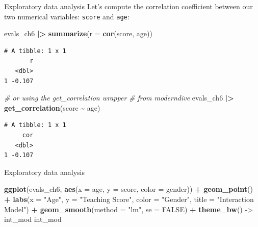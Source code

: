 \documentclass[
  ignorenonframetext,
]{beamer}
\newenvironment{Shaded}{\begin{snugshade}}{\end{snugshade}}
\newcommand{\AttributeTok}[1]{\textcolor[rgb]{0.13,0.29,0.53}{#1}}
\newcommand{\CommentTok}[1]{\textcolor[rgb]{0.56,0.35,0.01}{\textit{#1}}}
\newcommand{\ConstantTok}[1]{\textcolor[rgb]{0.56,0.35,0.01}{#1}}
\newcommand{\FunctionTok}[1]{\textcolor[rgb]{0.13,0.29,0.53}{\textbf{#1}}}
\newcommand{\NormalTok}[1]{#1}
\newcommand{\OtherTok}[1]{\textcolor[rgb]{0.56,0.35,0.01}{#1}}
\newcommand{\SpecialCharTok}[1]{\textcolor[rgb]{0.81,0.36,0.00}{\textbf{#1}}}
\newcommand{\StringTok}[1]{\textcolor[rgb]{0.31,0.60,0.02}{#1}}
\begin{document}
\begin{frame}[fragile]{Exploratory data analysis}
\protect\hypertarget{exploratory-data-analysis-11}{}
Let's compute the correlation coefficient between our two numerical
variables: \texttt{score} and \texttt{age}:

\small

\begin{Shaded}
\begin{Highlighting}[]
\NormalTok{evals\_ch6 }\SpecialCharTok{|\textgreater{}} 
  \FunctionTok{summarize}\NormalTok{(}\AttributeTok{r =} \FunctionTok{cor}\NormalTok{(score, age))}
\end{Highlighting}
\end{Shaded}

\begin{verbatim}
# A tibble: 1 x 1
       r
   <dbl>
1 -0.107
\end{verbatim}

\begin{Shaded}
\begin{Highlighting}[]
\CommentTok{\# or using the get\_correlation wrapper}
\CommentTok{\# from moderndive}
\NormalTok{evals\_ch6 }\SpecialCharTok{|\textgreater{}} 
  \FunctionTok{get\_correlation}\NormalTok{(score }\SpecialCharTok{\textasciitilde{}}\NormalTok{ age)}
\end{Highlighting}
\end{Shaded}

\begin{verbatim}
# A tibble: 1 x 1
     cor
   <dbl>
1 -0.107
\end{verbatim}

\normalsize
\end{frame}

\begin{frame}[fragile]{Exploratory data analysis}
\protect\hypertarget{exploratory-data-analysis-12}{}
\normalsize

\begin{Shaded}
\begin{Highlighting}[]
\FunctionTok{ggplot}\NormalTok{(evals\_ch6, }\FunctionTok{aes}\NormalTok{(}\AttributeTok{x =}\NormalTok{ age, }\AttributeTok{y =}\NormalTok{ score, }\AttributeTok{color =}\NormalTok{ gender)) }\SpecialCharTok{+}
  \FunctionTok{geom\_point}\NormalTok{() }\SpecialCharTok{+}
  \FunctionTok{labs}\NormalTok{(}\AttributeTok{x =} \StringTok{"Age"}\NormalTok{, }\AttributeTok{y =} \StringTok{"Teaching Score"}\NormalTok{, }\AttributeTok{color =} \StringTok{"Gender"}\NormalTok{,}
       \AttributeTok{title =} \StringTok{"Interaction Model"}\NormalTok{) }\SpecialCharTok{+}
  \FunctionTok{geom\_smooth}\NormalTok{(}\AttributeTok{method =} \StringTok{"lm"}\NormalTok{, }\AttributeTok{se =} \ConstantTok{FALSE}\NormalTok{) }\SpecialCharTok{+} 
  \FunctionTok{theme\_bw}\NormalTok{() }\OtherTok{{-}\textgreater{}}\NormalTok{ int\_mod}
\NormalTok{int\_mod}
\end{Highlighting}
\end{Shaded}

\normalsize
\end{frame}
\end{document}
